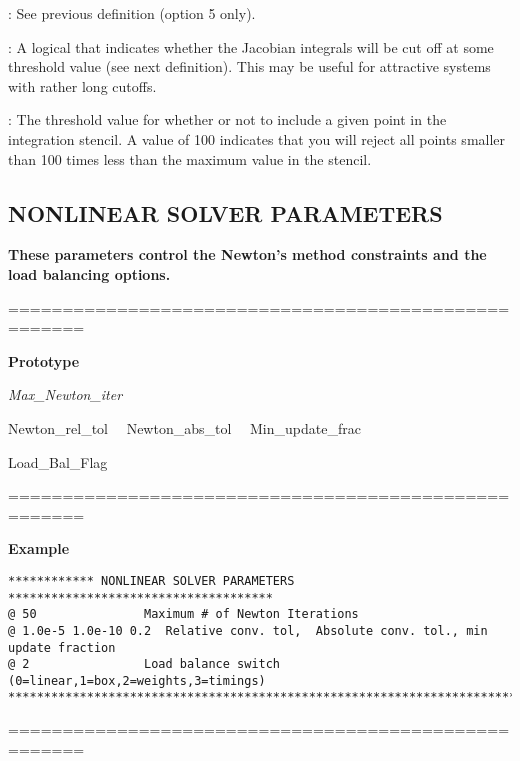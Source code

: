 \documentclass[10pt,onecolumn]{article}
\begin{document}
\vspace{0.1in}
:  See previous definition (option 5
only).

\vspace{0.1in}
:  A logical that indicates whether the
Jacobian integrals will be cut off at some threshold value
(see next definition).  This may be useful for attractive systems
with rather long cutoffs.

\vspace{0.1in}
:  The threshold value for whether
or not to include a given point in the integration stencil.  A
value of 100 indicates that you will reject all points smaller
than 100 times less than the maximum value in the stencil.

\vfill
\break

\subsection{NONLINEAR SOLVER PARAMETERS}
{\bf  These parameters
control the Newton's method constraints and the load balancing
options.}

\noindent=====================================================

{\bf Prototype}

{\it Max\_Newton\_iter

Newton\_rel\_tol \ \  Newton\_abs\_tol  \ \ Min\_update\_frac

Load\_Bal\_Flag

}

\noindent=====================================================

{\bf Example}

\begin{verbatim}
************ NONLINEAR SOLVER PARAMETERS *************************************
@ 50               Maximum # of Newton Iterations
@ 1.0e-5 1.0e-10 0.2  Relative conv. tol,  Absolute conv. tol., min update fraction
@ 2                Load balance switch (0=linear,1=box,2=weights,3=timings)
***********************************************************************
\end{verbatim}

\noindent=====================================================
\vspace{0.1in}

\end{document}
